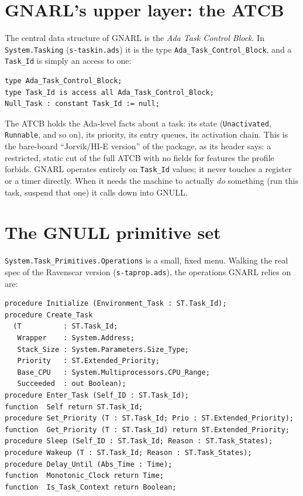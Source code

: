 \section{GNARL's upper layer: the ATCB}

The central data structure of GNARL is the \emph{Ada Task Control Block}. In
\texttt{System.Tasking} (\texttt{s-taskin.ads}) it is the type
\texttt{Ada\_Task\_Control\_Block}, and a \texttt{Task\_Id} is simply an access
to one:

\begin{lstlisting}
type Ada_Task_Control_Block;
type Task_Id is access all Ada_Task_Control_Block;
Null_Task : constant Task_Id := null;
\end{lstlisting}

The ATCB holds the Ada-level facts about a task: its state
(\texttt{Unactivated}, \texttt{Runnable}, and so on), its priority, its entry
queues, its activation chain. This is the bare-board ``Jorvik/HI-E version'' of
the package, as its header says: a restricted, static cut of the full ATCB
with no fields for features the profile forbids. GNARL operates entirely on
\texttt{Task\_Id} values; it never touches a register or a timer directly.
When it needs the machine to actually \emph{do} something (run this task,
suspend that one) it calls down into GNULL.

\section{The GNULL primitive set}

\texttt{System.Task\_Primitives.Operations} is a small, fixed menu. Walking the
real spec of the Ravenscar version (\texttt{s-taprop.ads}), the operations GNARL
relies on are:

\begin{lstlisting}
procedure Initialize (Environment_Task : ST.Task_Id);
procedure Create_Task
  (T          : ST.Task_Id;
   Wrapper    : System.Address;
   Stack_Size : System.Parameters.Size_Type;
   Priority   : ST.Extended_Priority;
   Base_CPU   : System.Multiprocessors.CPU_Range;
   Succeeded  : out Boolean);
procedure Enter_Task (Self_ID : ST.Task_Id);
function  Self return ST.Task_Id;
procedure Set_Priority (T : ST.Task_Id; Prio : ST.Extended_Priority);
function  Get_Priority (T : ST.Task_Id) return ST.Extended_Priority;
procedure Sleep (Self_ID : ST.Task_Id; Reason : ST.Task_States);
procedure Wakeup (T : ST.Task_Id; Reason : ST.Task_States);
procedure Delay_Until (Abs_Time : Time);
function  Monotonic_Clock return Time;
function  Is_Task_Context return Boolean;
\end{lstlisting}

